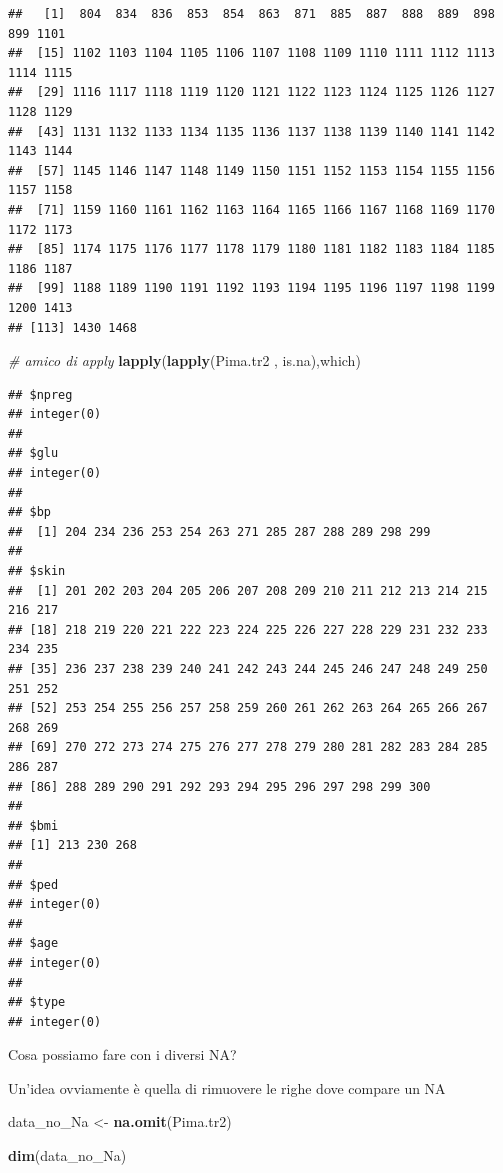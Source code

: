 \documentclass[]{book}
\newenvironment{Shaded}{\begin{snugshade}}{\end{snugshade}}
\newcommand{\CommentTok}[1]{\textcolor[rgb]{0.56,0.35,0.01}{\textit{#1}}}
\newcommand{\KeywordTok}[1]{\textcolor[rgb]{0.13,0.29,0.53}{\textbf{#1}}}
\newcommand{\NormalTok}[1]{#1}
\newcommand{\StringTok}[1]{\textcolor[rgb]{0.31,0.60,0.02}{#1}}
\begin{document}
\begin{verbatim}
##   [1]  804  834  836  853  854  863  871  885  887  888  889  898  899 1101
##  [15] 1102 1103 1104 1105 1106 1107 1108 1109 1110 1111 1112 1113 1114 1115
##  [29] 1116 1117 1118 1119 1120 1121 1122 1123 1124 1125 1126 1127 1128 1129
##  [43] 1131 1132 1133 1134 1135 1136 1137 1138 1139 1140 1141 1142 1143 1144
##  [57] 1145 1146 1147 1148 1149 1150 1151 1152 1153 1154 1155 1156 1157 1158
##  [71] 1159 1160 1161 1162 1163 1164 1165 1166 1167 1168 1169 1170 1172 1173
##  [85] 1174 1175 1176 1177 1178 1179 1180 1181 1182 1183 1184 1185 1186 1187
##  [99] 1188 1189 1190 1191 1192 1193 1194 1195 1196 1197 1198 1199 1200 1413
## [113] 1430 1468
\end{verbatim}

\begin{Shaded}
\begin{Highlighting}[]
\CommentTok{# amico di apply}
\KeywordTok{lapply}\NormalTok{(}\KeywordTok{lapply}\NormalTok{(Pima.tr2 , is.na),which)}
\end{Highlighting}
\end{Shaded}

\begin{verbatim}
## $npreg
## integer(0)
## 
## $glu
## integer(0)
## 
## $bp
##  [1] 204 234 236 253 254 263 271 285 287 288 289 298 299
## 
## $skin
##  [1] 201 202 203 204 205 206 207 208 209 210 211 212 213 214 215 216 217
## [18] 218 219 220 221 222 223 224 225 226 227 228 229 231 232 233 234 235
## [35] 236 237 238 239 240 241 242 243 244 245 246 247 248 249 250 251 252
## [52] 253 254 255 256 257 258 259 260 261 262 263 264 265 266 267 268 269
## [69] 270 272 273 274 275 276 277 278 279 280 281 282 283 284 285 286 287
## [86] 288 289 290 291 292 293 294 295 296 297 298 299 300
## 
## $bmi
## [1] 213 230 268
## 
## $ped
## integer(0)
## 
## $age
## integer(0)
## 
## $type
## integer(0)
\end{verbatim}

Cosa possiamo fare con i diversi NA?

Un'idea ovviamente è quella di rimuovere le righe dove compare un NA

\begin{Shaded}
\begin{Highlighting}[]
\NormalTok{data_no_Na <-}\StringTok{ }\KeywordTok{na.omit}\NormalTok{(Pima.tr2)}

\KeywordTok{dim}\NormalTok{(data_no_Na)}
\end{Highlighting}
\end{Shaded}
\end{document}
